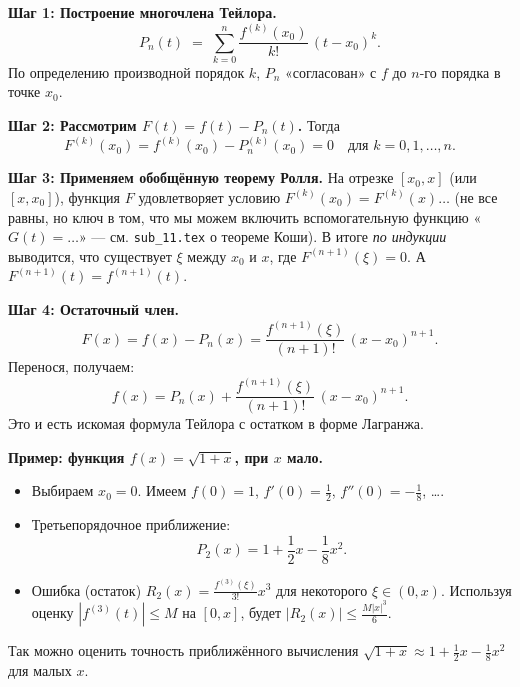 \medskip


\textbf{Шаг 1: Построение многочлена Тейлора.}
\[
P_n(t) \;=\; \sum_{k=0}^{n} \frac{f^{(k)}(x_0)}{k!}\,(t - x_0)^k.
\]
По определению производной порядок $k$, $P_n$ «согласован» с $f$ до $n$-го порядка в точке $x_0$.

\textbf{Шаг 2: Рассмотрим $F(t)=f(t) - P_n(t)$.}
Тогда
\[
F^{(k)}(x_0) = f^{(k)}(x_0) - P_n^{(k)}(x_0) = 0 \quad\text{для } k=0,1,\dots,n.
\]

\textbf{Шаг 3: Применяем обобщённую теорему Ролля.}
На отрезке $[x_0, x]$ (или $[x,x_0]$), функция $F$ удовлетворяет условию $F^{(k)}(x_0)=F^{(k)}(x) \dots$ (не все равны, но ключ в том, что мы можем включить вспомогательную функцию «$G(t)=\dots$» — см. \texttt{sub\_11.tex} о теореме Коши). В итоге \emph{по индукции} выводится, что существует $\xi$ между $x_0$ и $x$, где $F^{(n+1)}(\xi)=0$. А $F^{(n+1)}(t)=f^{(n+1)}(t)$.

\textbf{Шаг 4: Остаточный член.}
\[
F(x) = f(x)-P_n(x) = \frac{f^{(n+1)}(\xi)}{(n+1)!}\,(x - x_0)^{n+1}.
\]
Перенося, получаем:
\[
f(x)=P_n(x) + \frac{f^{(n+1)}(\xi)}{(n+1)!}\,(x - x_0)^{n+1}.
\]
Это и есть искомая формула Тейлора с остатком в форме Лагранжа.

\medskip


\textbf{Пример: функция $f(x)=\sqrt{1+x}$, при $x$ мало.}
\begin{itemize}
  \item Выбираем $x_0=0$. Имеем $f(0)=1$, $f'(0)=\tfrac12$, $f''(0)=-\tfrac{1}{8}$, \dots .
  \item Третьепорядочное приближение: 
  \[
    P_2(x)=1 + \frac12 x - \frac{1}{8} x^2.
  \]
  \item Ошибка (остаток) $R_2(x)=\frac{f^{(3)}(\xi)}{3!} x^3$ для некоторого $\xi \in (0,x)$.  
  Используя оценку $|f^{(3)}(t)|\le M$ на $[0,x]$, будет 
  \(\bigl|R_2(x)\bigr|\le \frac{M|x|^3}{6}.\)
\end{itemize}
Так можно оценить точность приближённого вычисления $\sqrt{1+x}\approx 1 + \tfrac12 x - \tfrac18 x^2$ для малых $x$.

\medskip

